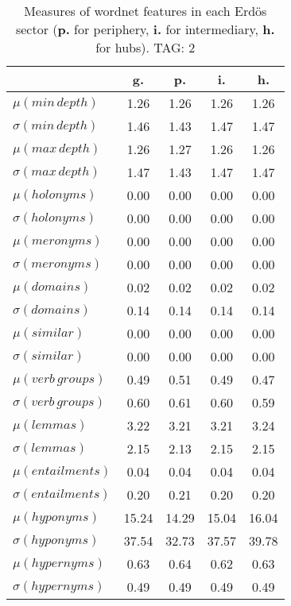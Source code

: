 \begin{table}[h!]
\begin{center}
\begin{tabular}{| l | c | c | c | c |}\hline
 & g. & p. & i. & h. \\\hline
$\mu(min\,depth)$ & 1.26  & 1.26  & 1.26  & 1.26 \\\hline
$\sigma(min\,depth)$ & 1.46  & 1.43  & 1.47  & 1.47 \\\hline
$\mu(max\,depth)$ & 1.26  & 1.27  & 1.26  & 1.26 \\\hline
$\sigma(max\,depth)$ & 1.47  & 1.43  & 1.47  & 1.47 \\\hline
$\mu(holonyms)$ & 0.00  & 0.00  & 0.00  & 0.00 \\\hline
$\sigma(holonyms)$ & 0.00  & 0.00  & 0.00  & 0.00 \\\hline
$\mu(meronyms)$ & 0.00  & 0.00  & 0.00  & 0.00 \\\hline
$\sigma(meronyms)$ & 0.00  & 0.00  & 0.00  & 0.00 \\\hline
$\mu(domains)$ & 0.02  & 0.02  & 0.02  & 0.02 \\\hline
$\sigma(domains)$ & 0.14  & 0.14  & 0.14  & 0.14 \\\hline
$\mu(similar)$ & 0.00  & 0.00  & 0.00  & 0.00 \\\hline
$\sigma(similar)$ & 0.00  & 0.00  & 0.00  & 0.00 \\\hline
$\mu(verb\,groups)$ & 0.49  & 0.51  & 0.49  & 0.47 \\\hline
$\sigma(verb\,groups)$ & 0.60  & 0.61  & 0.60  & 0.59 \\\hline
$\mu(lemmas)$ & 3.22  & 3.21  & 3.21  & 3.24 \\\hline
$\sigma(lemmas)$ & 2.15  & 2.13  & 2.15  & 2.15 \\\hline
$\mu(entailments)$ & 0.04  & 0.04  & 0.04  & 0.04 \\\hline
$\sigma(entailments)$ & 0.20  & 0.21  & 0.20  & 0.20 \\\hline
$\mu(hyponyms)$ & 15.24  & 14.29  & 15.04  & 16.04 \\\hline
$\sigma(hyponyms)$ & 37.54  & 32.73  & 37.57  & 39.78 \\\hline
$\mu(hypernyms)$ & 0.63  & 0.64  & 0.62  & 0.63 \\\hline
$\sigma(hypernyms)$ & 0.49  & 0.49  & 0.49  & 0.49 \\\hline
\end{tabular}
\caption{Measures of wordnet features in each Erd\"os sector ({{\bf p.}} for periphery, {{\bf i.}} for intermediary, {{\bf h.}} for hubs). TAG: 2}
\end{center}
\end{table}